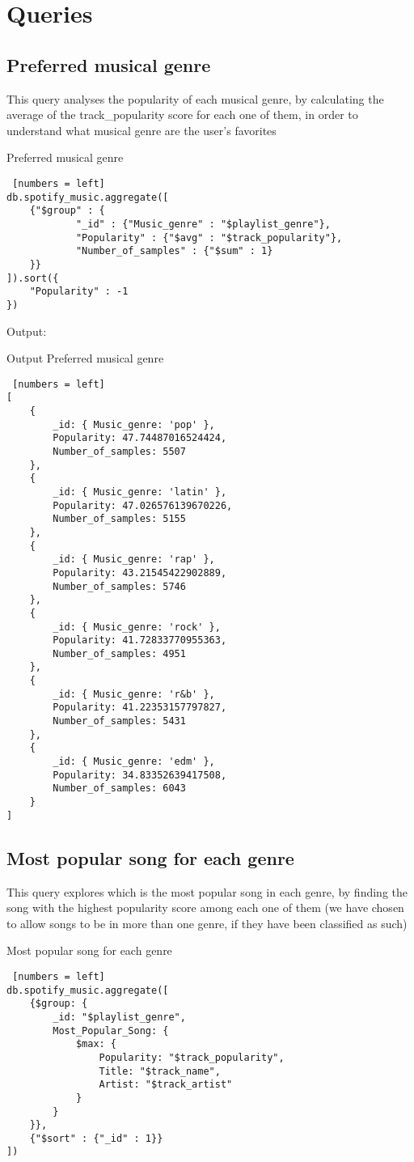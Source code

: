 \documentclass{Configuration_Files/PoliMi3i_thesis}
\begin{document}
\section*{Queries}
\subsection{Preferred musical genre}
This query analyses the popularity of each musical genre, by calculating the average of the track\_popularity score for each one of them, in order to understand what musical genre are the user's favorites\\

\begin{algorithm}[ht]
\caption{Preferred musical genre}
\begin{lstlisting} [numbers = left]
db.spotify_music.aggregate([
	{"$group" : {
			"_id" : {"Music_genre" : "$playlist_genre"},
			"Popularity" : {"$avg" : "$track_popularity"},
			"Number_of_samples" : {"$sum" : 1}
	}}
]).sort({
	"Popularity" : -1
})
\end{lstlisting}
\end{algorithm}
\newpage

Output:
\begin{algorithm}[h!]
\caption{Output Preferred musical genre}
\begin{lstlisting} [numbers = left]
[
	{
		_id: { Music_genre: 'pop' },
		Popularity: 47.74487016524424,
		Number_of_samples: 5507
	},
	{
		_id: { Music_genre: 'latin' },
		Popularity: 47.026576139670226,
		Number_of_samples: 5155
	},
	{
		_id: { Music_genre: 'rap' },
		Popularity: 43.21545422902889,
		Number_of_samples: 5746
	},
	{
		_id: { Music_genre: 'rock' },
		Popularity: 41.72833770955363,
		Number_of_samples: 4951
	},
	{
		_id: { Music_genre: 'r&b' },
		Popularity: 41.22353157797827,
		Number_of_samples: 5431
	},
	{
		_id: { Music_genre: 'edm' },
		Popularity: 34.83352639417508,
		Number_of_samples: 6043
	}
]
\end{lstlisting}
\end{algorithm}
\newpage

\subsection{Most popular song for each genre}
This query explores which is the most popular song in each genre, by finding the song with the highest popularity score among each one of them (we have chosen to allow songs to be in more than one genre, if they have been classified as such)\\
\begin{algorithm}[ht]
\caption{Most popular song for each genre}
\begin{lstlisting} [numbers = left]
db.spotify_music.aggregate([
	{$group: {
		_id: "$playlist_genre",
		Most_Popular_Song: {
			$max: {
				Popularity: "$track_popularity",
				Title: "$track_name",
				Artist: "$track_artist"
			}
		}
	}},
	{"$sort" : {"_id" : 1}}
])
\end{lstlisting}
\end{algorithm}
\newpage
\end{document}
